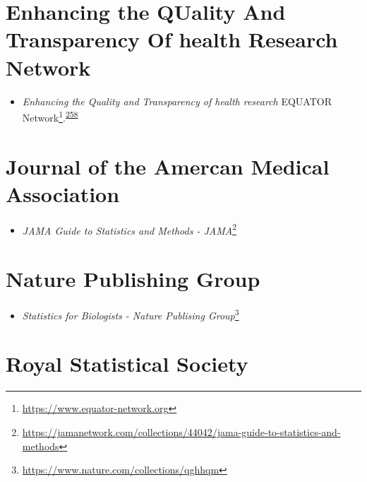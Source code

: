 \documentclass[
  a4paper,
]{book}
\providecommand{\tightlist}{%
  \setlength{\itemsep}{0pt}\setlength{\parskip}{0pt}}
\renewcommand{\href}[2]{#2\footnote{\url{#1}}}
\begin{document}
\hypertarget{enhancing-the-quality-and-transparency-of-health-research-network}{%
\section*{Enhancing the QUality And Transparency Of health Research Network}\label{enhancing-the-quality-and-transparency-of-health-research-network}}

\begin{itemize}
\tightlist
\item
  \emph{Enhancing the Quality and Transparency of health research} \href{https://www.equator-network.org}{EQUATOR Network}.\textsuperscript{\protect\hyperlink{ref-Altman2008}{258}}
\end{itemize}

\hypertarget{journal-of-the-amercan-medical-association}{%
\section*{Journal of the Amercan Medical Association}\label{journal-of-the-amercan-medical-association}}

\begin{itemize}
\tightlist
\item
  \href{https://jamanetwork.com/collections/44042/jama-guide-to-statistics-and-methods}{\emph{JAMA Guide to Statistics and Methods - JAMA}}
\end{itemize}

\hypertarget{nature-publishing-group}{%
\section*{Nature Publishing Group}\label{nature-publishing-group}}

\begin{itemize}
\tightlist
\item
  \href{https://www.nature.com/collections/qghhqm}{\emph{Statistics for Biologists - Nature Publising Group}}
\end{itemize}

\hypertarget{royal-statistical-society}{%
\section*{Royal Statistical Society}\label{royal-statistical-society}}
\end{document}
